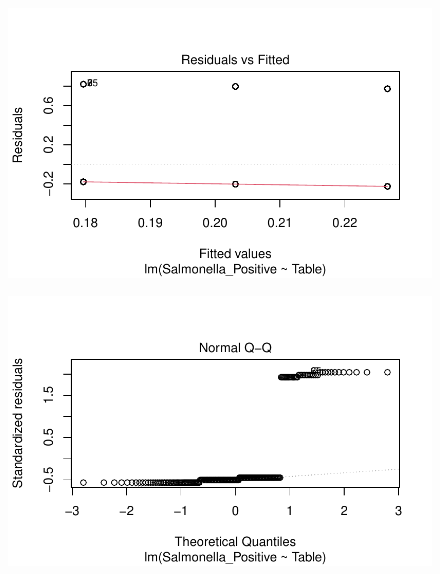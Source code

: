 \documentclass[
  letterpaper,
  DIV=11,
  numbers=noendperiod]{scrartcl}
\begin{document}
\begin{figure}[H]

{\centering \includegraphics{Supplementary_Material_files/figure-pdf/unnamed-chunk-3-1.pdf}

}

\end{figure}

\begin{figure}[H]

{\centering \includegraphics{Supplementary_Material_files/figure-pdf/unnamed-chunk-3-2.pdf}

}

\end{figure}
\end{document}
